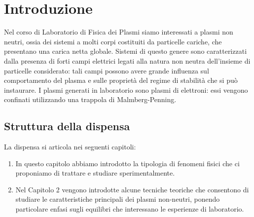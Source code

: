 \chapter{Introduzione}

Nel corso di Laboratorio di Fisica dei Plasmi siamo interessati a plasmi non neutri, ossia dei sistemi a molti corpi
costituiti da particelle cariche, che presentano una carica netta globale. Sistemi di questo genere sono caratterizzati
dalla presenza di forti campi elettrici legati alla natura non neutra dell'insieme di particelle considerato: tali campi
possono avere grande influenza sul comportamento del plasma e sulle proprietà del regime di stabilità che si può instaurare.
I plasmi generati in laboratorio sono plasmi di elettroni: essi vengono confinati utilizzando una trappola di Malmberg-Penning.

\section{Struttura della dispensa}

La dispensa si articola nei seguenti capitoli:
\begin{enumerate}
    \item In questo capitolo abbiamo introdotto la tipologia di fenomeni fisici che ci proponiamo di trattare
    e studiare sperimentalmente.
    \item Nel Capitolo 2 vengono introdotte alcune tecniche teoriche che consentono di studiare le caratteristiche principali
    dei plasmi non-neutri, ponendo particolare enfasi sugli equilibri che interessano le esperienze di laboratorio.
  \end{enumerate}
